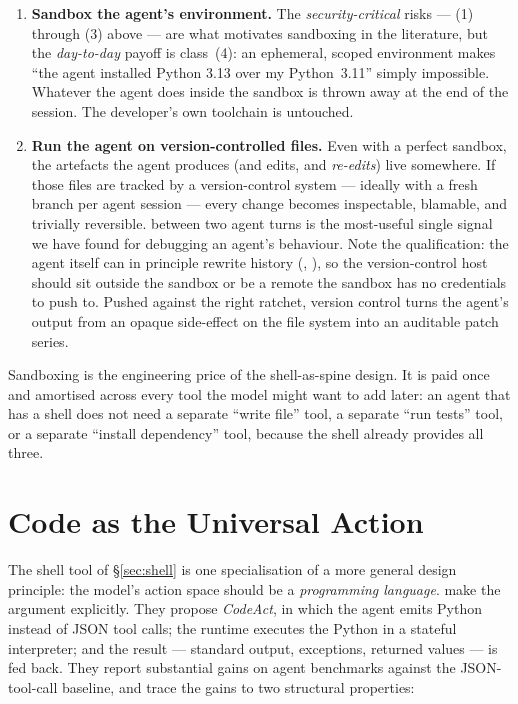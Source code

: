 \begin{enumerate}[label=\textbf{(\arabic*)},leftmargin=2.2em,itemsep=0.4em]

\item \textbf{Sandbox the agent's environment.} The
  \emph{security-critical} risks --- (1) through (3) above --- are
  what motivates sandboxing in the literature, but the
  \emph{day-to-day} payoff is class~(4): an ephemeral, scoped
  environment makes ``the agent installed Python 3.13 over my
  Python~3.11'' simply impossible. Whatever the agent does inside
  the sandbox is thrown away at the end of the session. The
  developer's own toolchain is untouched.

\item \textbf{Run the agent on version-controlled files.} Even with
  a perfect sandbox, the artefacts the agent produces (and edits,
  and \emph{re-edits}) live somewhere. If those files are tracked by
  a version-control system --- ideally with a fresh branch per agent
  session --- every change becomes inspectable, blamable, and
  trivially reversible.  between two agent turns is
  the most-useful single signal we have found for debugging an
  agent's behaviour. Note the qualification: the agent itself can in
  principle rewrite history (,
  ), so the version-control host should sit
  outside the sandbox or be a remote the sandbox has no credentials
  to push to. Pushed against the right ratchet, version control
  turns the agent's output from an opaque side-effect on the file
  system into an auditable patch series.

\end{enumerate}

\noindent
Sandboxing is the engineering price of the shell-as-spine design. It
is paid once and amortised across every tool the model might want to
add later: an agent that has a shell does not need a separate
``write file'' tool, a separate ``run tests'' tool, or a separate
``install dependency'' tool, because the shell already provides all
three.

\section{Code as the Universal Action}
\label{sec:codeact}

The shell tool of \S\ref{sec:shell} is one specialisation of a more
general design principle: the model's action space should be a
\emph{programming language}. \citet{wang2024codeact} make the
argument explicitly. They propose \emph{CodeAct}, in which the agent
emits Python instead of JSON tool calls; the runtime executes the
Python in a stateful interpreter; and the result --- standard
output, exceptions, returned values --- is fed back. They report
substantial gains on agent benchmarks against the JSON-tool-call
baseline, and trace the gains to two structural properties:

